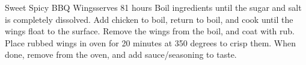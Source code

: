 
\begin{recipe}{Sweet Spicy BBQ Wings}{serves 8}{1 hours}
  Boil ingredients until the sugar and salt is completely dissolved.
  Add chicken to boil, return to boil, and cook until the wings float to the surface.
  Remove the wings from the boil, and coat with rub.  Place rubbed wings in oven for 20 minutes at 350 degrees to crisp them.  When done, remove from the oven, and add sauce/seasoning to taste.
\end{recipe}
